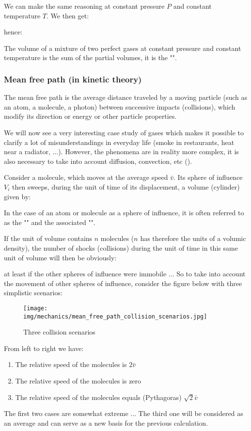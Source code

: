 	We can make the same reasoning at constant pressure $P$ and constant temperature $T$. We then get:
	
	hence:
	
	The volume of a mixture of two perfect gases at constant pressure and constant temperature is the sum of the partial volumes, it is the "".
	
	\pagebreak
	\subsubsection{Mean free path (in kinetic theory)}
	The mean free path is the average distance traveled by a moving particle (such as an atom, a molecule, a photon) between successive impacts (collisions), which modify its direction or energy or other particle properties.
	
	We will now see a very interesting case study of gases which makes it possible to clarify a lot of misunderstandings in everyday life (smoke in restaurants, heat near a radiator, ...). However, the phenomena are in reality more complex, it is also necessary to take into account diffusion, convection, etc ().

	Consider a molecule, which moves at the average speed $\bar{v}$. Its sphere of influence $V_i$ then sweeps, during the unit of time of its displacement, a volume (cylinder) given by:
	
	\begin{tcolorbox}[title=Remark,colframe=black,arc=10pt]
	In the case of an atom or molecule as a sphere of influence, it is often referred to as the "" and the associated "".
	\end{tcolorbox}
	If the unit of volume contains $n$ molecules ($n$ has therefore the units of a volumic density), the number of shocks (collisions) during the unit of time in this same unit of volume will then be obviously:
	
	at least if the other spheres of influence were immobile ... So to take into account the movement of other spheres of influence, consider the figure below with three simplistic scenarios:
	\begin{figure}[H]
		\centering
		\texttt{[image: img/mechanics/mean\_free\_path\_collision\_scenarios.jpg]}
		\caption[]{Three collision scenarios}
	\end{figure}
	From left to right we have:
	\begin{enumerate}
		\item The relative speed of the molecules is $2\bar{v}$

		\item The relative speed of the molecules is zero

		\item The relative speed of the molecules equals (Pythagoras) $\sqrt{2}\bar{v}$
	\end{enumerate}
	The first two cases are somewhat extreme ... The third one will be considered as an average and can serve as a new basis for the previous calculation.

